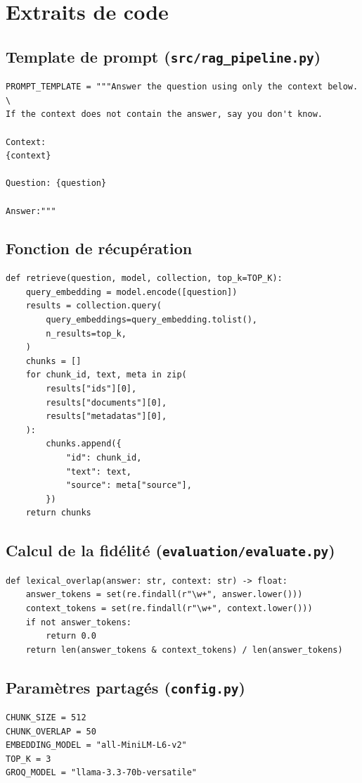 \section{Extraits de code}
\label{ann:code}

\subsection{Template de prompt (\texttt{src/rag\_pipeline.py})}

\begin{lstlisting}[style=python,caption={Template de prompt limitant les hallucinations.}]
PROMPT_TEMPLATE = """Answer the question using only the context below. \
If the context does not contain the answer, say you don't know.

Context:
{context}

Question: {question}

Answer:"""
\end{lstlisting}

\subsection{Fonction de r\'ecup\'eration}

\begin{lstlisting}[style=python,caption={R\'ecup\'eration des top-k chunks depuis ChromaDB.}]
def retrieve(question, model, collection, top_k=TOP_K):
    query_embedding = model.encode([question])
    results = collection.query(
        query_embeddings=query_embedding.tolist(),
        n_results=top_k,
    )
    chunks = []
    for chunk_id, text, meta in zip(
        results["ids"][0],
        results["documents"][0],
        results["metadatas"][0],
    ):
        chunks.append({
            "id": chunk_id,
            "text": text,
            "source": meta["source"],
        })
    return chunks
\end{lstlisting}

\subsection{Calcul de la fid\'elit\'e (\texttt{evaluation/evaluate.py})}

\begin{lstlisting}[style=python,caption={Recouvrement lexical entre reponse et contexte.}]
def lexical_overlap(answer: str, context: str) -> float:
    answer_tokens = set(re.findall(r"\w+", answer.lower()))
    context_tokens = set(re.findall(r"\w+", context.lower()))
    if not answer_tokens:
        return 0.0
    return len(answer_tokens & context_tokens) / len(answer_tokens)
\end{lstlisting}

\subsection{Param\`etres partag\'es (\texttt{config.py})}

\begin{lstlisting}[style=python,caption={Constantes centralisees du projet.}]
CHUNK_SIZE = 512
CHUNK_OVERLAP = 50
EMBEDDING_MODEL = "all-MiniLM-L6-v2"
TOP_K = 3
GROQ_MODEL = "llama-3.3-70b-versatile"
\end{lstlisting}
